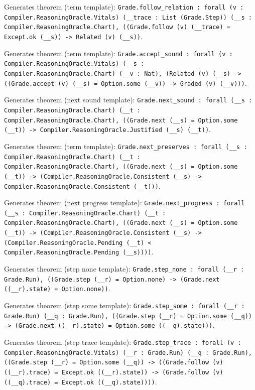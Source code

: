 \documentclass[11pt]{article}
\begin{document}
\noindent Generates theorem (term template): \texttt{Grade.follow\_relation : forall (v : Compiler.ReasoningOracle.Vitals) (\_\_trace : List (Grade.Step)) (\_\_s : Compiler.ReasoningOracle.Chart), ((Grade.follow (v) (\_\_trace) = Except.ok (\_\_s)) -> Related (v) (\_\_s))}.\par
\noindent Generates theorem (term template): \texttt{Grade.accept\_sound : forall (v : Compiler.ReasoningOracle.Vitals) (\_\_s : Compiler.ReasoningOracle.Chart) (\_\_v : Nat), (Related (v) (\_\_s) -> ((Grade.accept (v) (\_\_s) = Option.some (\_\_v)) -> Graded (v) (\_\_v)))}.\par
\noindent Generates theorem (next sound template): \texttt{Grade.next\_sound : forall (\_\_s : Compiler.ReasoningOracle.Chart) (\_\_t : Compiler.ReasoningOracle.Chart), ((Grade.next (\_\_s) = Option.some (\_\_t)) -> Compiler.ReasoningOracle.Justified (\_\_s) (\_\_t))}.\par
\noindent Generates theorem (term template): \texttt{Grade.next\_preserves : forall (\_\_s : Compiler.ReasoningOracle.Chart) (\_\_t : Compiler.ReasoningOracle.Chart), ((Grade.next (\_\_s) = Option.some (\_\_t)) -> (Compiler.ReasoningOracle.Consistent (\_\_s) -> Compiler.ReasoningOracle.Consistent (\_\_t)))}.\par
\noindent Generates theorem (next progress template): \texttt{Grade.next\_progress : forall (\_\_s : Compiler.ReasoningOracle.Chart) (\_\_t : Compiler.ReasoningOracle.Chart), ((Grade.next (\_\_s) = Option.some (\_\_t)) -> (Compiler.ReasoningOracle.Consistent (\_\_s) -> (Compiler.ReasoningOracle.Pending (\_\_t) < Compiler.ReasoningOracle.Pending (\_\_s))))}.\par
\noindent Generates theorem (step none template): \texttt{Grade.step\_none : forall (\_\_r : Grade.Run), ((Grade.step (\_\_r) = Option.none) -> (Grade.next ((\_\_r).state) = Option.none))}.\par
\noindent Generates theorem (step some template): \texttt{Grade.step\_some : forall (\_\_r : Grade.Run) (\_\_q : Grade.Run), ((Grade.step (\_\_r) = Option.some (\_\_q)) -> (Grade.next ((\_\_r).state) = Option.some ((\_\_q).state)))}.\par
\noindent Generates theorem (step trace template): \texttt{Grade.step\_trace : forall (v : Compiler.ReasoningOracle.Vitals) (\_\_r : Grade.Run) (\_\_q : Grade.Run), ((Grade.step (\_\_r) = Option.some (\_\_q)) -> ((Grade.follow (v) ((\_\_r).trace) = Except.ok ((\_\_r).state)) -> (Grade.follow (v) ((\_\_q).trace) = Except.ok ((\_\_q).state))))}.\par
\end{document}
